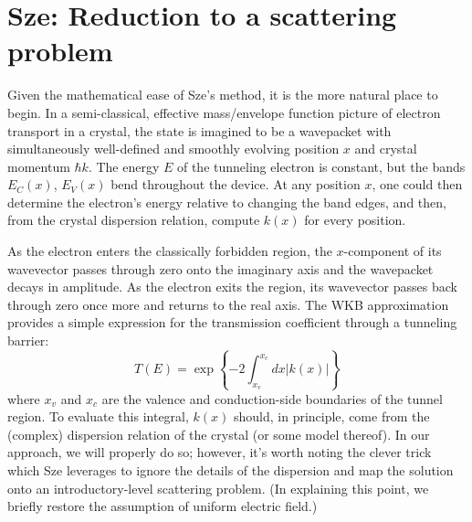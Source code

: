 \section{Sze: Reduction to a scattering problem}
Given the mathematical ease of Sze's method, it is the more natural place to begin.  In a semi-classical, effective mass/envelope function picture of electron transport in a crystal, the state is imagined to be a wavepacket with simultaneously well-defined and smoothly evolving position $x$ and crystal momentum $\hbar k$.  The energy $E$ of the tunneling electron is constant, but the bands $E_C(x)$, $E_V(x)$ bend throughout the device.  At any position $x$, one could then determine the electron's energy relative to changing the band edges, and then, from the crystal dispersion relation, compute $k(x)$ for every position.

As the electron enters the classically forbidden region, the $x$-component of its wavevector passes through zero onto the imaginary axis and the wavepacket decays in amplitude.  As the electron exits the region, its wavevector passes back through zero once more and returns to the real axis.  The WKB approximation provides a simple expression for the transmission coefficient through a tunneling barrier:
$$T(E)=\exp\left\{-2\int_{x_v}^{x_c}dx|k(x)|\right\}$$
where $x_v$ and $x_c$ are the valence and conduction-side boundaries of the tunnel region.  To evaluate this integral, $k(x)$ should, in principle, come from the (complex) dispersion relation of the crystal (or some model thereof).  In our approach, we will properly do so; however, it's worth noting the clever trick which Sze leverages to ignore the details of the dispersion and map the solution onto an introductory-level scattering problem.  (In explaining this point, we briefly restore the assumption of uniform electric field.)  